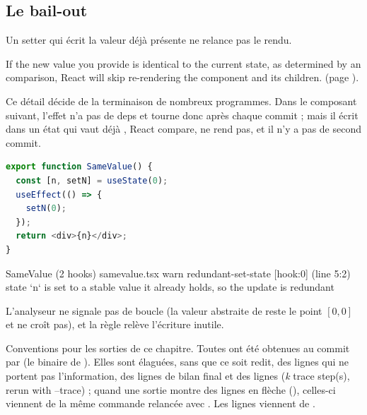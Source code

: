 \subsection{Le bail-out }

Un setter qui écrit la valeur déjà présente ne relance pas le rendu.

\begin{react}
\og If the new value you provide is identical to the current state, as
determined by an  comparison, React will skip re-rendering the
component and its children.\fg{} \cite{ReactDocs} (page ).
\end{react}

Ce détail décide de la terminaison de nombreux programmes. Dans le composant
suivant, l'effet n'a pas de deps et tourne donc après chaque commit ; mais il
écrit  dans un état qui vaut déjà , React compare, ne rend pas,
et il n'y a pas de second commit.

\begin{lstlisting}[language=TypeScript,caption={\code{SameValue} : un effet qui réécrit la valeur courante (\file{/tmp/ch02/samevalue.tsx}, imports omis)},label={lst:react-modele-samevalue}]
export function SameValue() {
  const [n, setN] = useState(0);
  useEffect(() => {
    setN(0);
  });
  return <div>{n}</div>;
}
\end{lstlisting}

\begin{sortie}
  SameValue  (2 hooks)  samevalue.tsx
    warn   redundant-set-state  [hook:0]  (line 5:2)  state `n` is set to a stable value it already holds, so the update is redundant
\end{sortie}

L'analyseur ne signale pas de boucle (la valeur abstraite de  reste le
point $[0,0]$ et ne croît pas), et la règle  relève
l'écriture inutile.

\begin{remarque}
Conventions pour les sorties de ce chapitre. Toutes ont été obtenues au commit
 par  (le binaire de ). Elles sont
élaguées, sans que ce soit redit, des lignes  qui ne portent pas
l'information, des lignes de bilan final et des lignes
\og (\emph{k} trace step(s), rerun with --trace)\fg{} ; quand une sortie
montre des lignes en flèche (), celles-ci viennent de la même
commande relancée avec . Les lignes \code{[verbose]} viennent de
.
\end{remarque}

